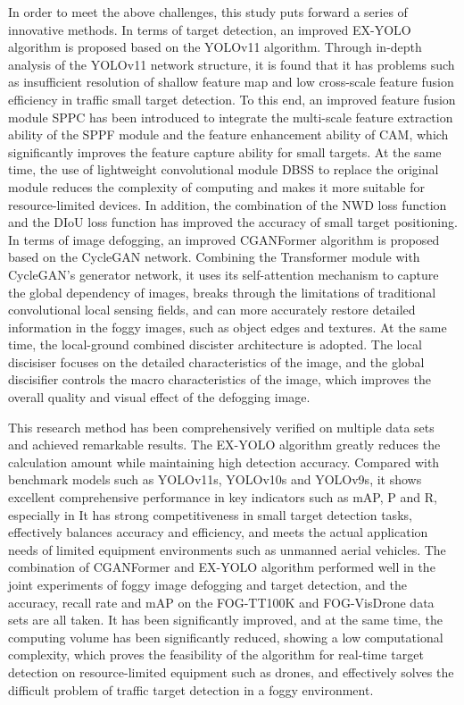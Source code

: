 \begin{enabstract}
In order to meet the above challenges, this study puts forward a series of innovative methods. In terms of target detection, an improved EX-YOLO algorithm is proposed based on the YOLOv11 algorithm. Through in-depth analysis of the YOLOv11 network structure, it is found that it has problems such as insufficient resolution of shallow feature map and low cross-scale feature fusion efficiency in traffic small target detection. To this end, an improved feature fusion module SPPC has been introduced to integrate the multi-scale feature extraction ability of the SPPF module and the feature enhancement ability of CAM, which significantly improves the feature capture ability for small targets. At the same time, the use of lightweight convolutional module DBSS to replace the original module reduces the complexity of computing and makes it more suitable for resource-limited devices. In addition, the combination of the NWD loss function and the DIoU loss function has improved the accuracy of small target positioning. In terms of image defogging, an improved CGANFormer algorithm is proposed based on the CycleGAN network. Combining the Transformer module with CycleGAN's generator network, it uses its self-attention mechanism to capture the global dependency of images, breaks through the limitations of traditional convolutional local sensing fields, and can more accurately restore detailed information in the foggy images, such as object edges and textures. At the same time, the local-ground combined discister architecture is adopted. The local discisiser focuses on the detailed characteristics of the image, and the global discisifier controls the macro characteristics of the image, which improves the overall quality and visual effect of the defogging image.

This research method has been comprehensively verified on multiple data sets and achieved remarkable results. The EX-YOLO algorithm greatly reduces the calculation amount while maintaining high detection accuracy. Compared with benchmark models such as YOLOv11s, YOLOv10s and YOLOv9s, it shows excellent comprehensive performance in key indicators such as mAP, P and R, especially in It has strong competitiveness in small target detection tasks, effectively balances accuracy and efficiency, and meets the actual application needs of limited equipment environments such as unmanned aerial vehicles. The combination of CGANFormer and EX-YOLO algorithm performed well in the joint experiments of foggy image defogging and target detection, and the accuracy, recall rate and mAP on the FOG-TT100K and FOG-VisDrone data sets are all taken. It has been significantly improved, and at the same time, the computing volume has been significantly reduced, showing a low computational complexity, which proves the feasibility of the algorithm for real-time target detection on resource-limited equipment such as drones, and effectively solves the difficult problem of traffic target detection in a foggy environment.


\end{enabstract}

